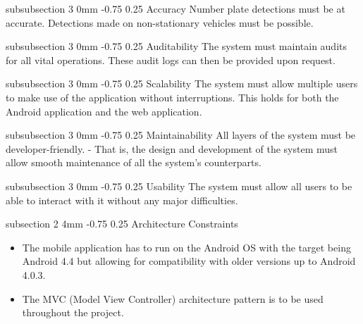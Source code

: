 \documentclass[12pt]{article}
\makeatletter
\renewcommand{\subsection}{\@startsection
   {subsection}%
   {2}%
   {4mm}%
   {-0.75\baselineskip}%
   {0.25\baselineskip}%
   {\rmfamily\normalfont\scshape\normalsize}}%
\renewcommand{\subsubsection}{\@startsection
   {subsubsection}%
   {3}%
   {0mm}%
   {-0.75\baselineskip}%
   {0.25\baselineskip}%
   {\rmfamily\normalfont\slshape\normalsize}}%
\makeatother
\begin{document}
                			    \subsubsection{Accuracy}
                			    		Number plate detections must be at accurate. Detections made on non-stationary vehicles must be possible.
                			    		             	
                				\subsubsection{Auditability}
		   			                   	The system must maintain audits for all vital operations. These audit logs can then be provided upon request. 
		   			            		
                				\subsubsection{Scalability}
	   			                   		The system must allow multiple users to make use of the application without interruptions. This holds for both the Android application and the web application.
		       			                  	
               					\subsubsection{Maintainability}
					                  	All layers of the system must be developer-friendly. - That is, the design and development of the system must allow smooth maintenance of all the system's counterparts.
       						    
       						    \subsubsection{Usability}
			    	                  	The system must allow all users to be able to interact with it without any major difficulties.
       						    	                  	
                
                		\subsection{Architecture Constraints}
                				
                				\begin{itemize}
                						\item The mobile application has to run on the Android OS with the target being Android 4.4 but allowing for compatibility with older versions up to Android 4.0.3. 
                						\item The MVC (Model View Controller) architecture pattern is to be used throughout the project.
                				\end{itemize}
               
\end{document}
